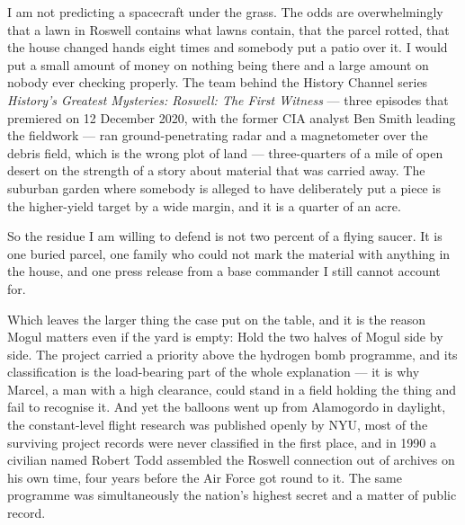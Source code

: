 I am not predicting a spacecraft under the grass. The odds are overwhelmingly that a lawn in Roswell
contains what lawns contain, that the parcel rotted, that the house changed hands eight times and
somebody put a patio over it. I would put a small amount of money on nothing being there and a large
amount on nobody
ever checking properly.  The team behind the History Channel series
\emph{History's Greatest Mysteries: Roswell: The First Witness} --- three episodes that premiered on
12 December 2020, with the former CIA analyst Ben Smith leading the fieldwork --- ran
ground-penetrating radar and
a magnetometer over the debris field, which is the wrong plot of land --- three-quarters of a mile of
open desert on the strength of a story about material that was carried away. The suburban garden where
somebody is alleged to have deliberately put a piece is the higher-yield target by a wide margin, and
it is a quarter of an acre.

So the residue I am willing to defend is not two percent of a flying saucer. It is one buried parcel,
one family who could not mark the material with anything in the house, and one press release from a
base commander I still cannot account for.

Which leaves the larger thing the case put on the table, and it is the reason Mogul matters even if the
yard is empty:  Hold the two halves of Mogul side by side. The project carried a priority above the hydrogen bomb
programme, and its classification is the load-bearing part of the whole explanation --- it is why
Marcel, a man with a high clearance, could stand in a field holding the thing and fail to recognise
it. And yet the balloons went up from Alamogordo in daylight, the constant-level flight research was
published openly by NYU, most of the surviving project records were never classified in the first
place, and in 1990 a civilian named Robert Todd assembled the Roswell connection out of archives on
his own time, four years before the Air Force got round to it. The same programme was simultaneously
the nation's highest secret and a matter of public record.


